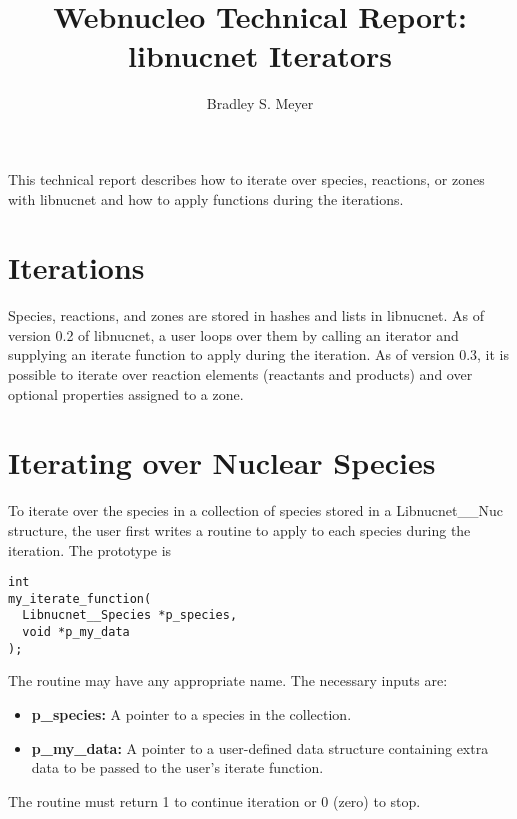 \documentclass{article}    %
\title{Webnucleo Technical Report: libnucnet Iterators }
\author{Bradley S. Meyer}
\begin{document}

\maketitle                 %


This technical report describes how to iterate over species, reactions,
or zones with libnucnet and how to apply functions during the iterations.

\section{Iterations}

Species, reactions, and zones are stored in hashes and lists in libnucnet.
As of version 0.2 of libnucnet, a user loops over them by calling
an iterator and supplying an iterate function to apply during the iteration.
As of version 0.3, it is possible to iterate over reaction elements (reactants
and products) and over optional properties assigned to a zone.

\section{Iterating over Nuclear Species}

To iterate over the species in a collection of species stored
in a Libnucnet\_\_Nuc structure, the user first writes a routine to apply
to each species during the iteration.  The prototype is

\begin{verbatim}
int
my_iterate_function(
  Libnucnet__Species *p_species,
  void *p_my_data
);
\end{verbatim}

The routine may have any appropriate name.  The necessary inputs are:

\begin{itemize}

\item {\bf p\_species:}  A pointer to a species in the collection.

\item {\bf p\_my\_data:}  A pointer to a user-defined data structure containing
extra data to be passed to the user's iterate function.

\end{itemize}

\noindent The routine must return 1 to continue iteration or 0 (zero) to stop.
\end{document}
